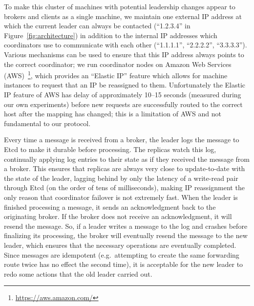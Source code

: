 To make this cluster of machines with potential leadership changes appear to brokers and clients as a single machine, we maintain one external IP address at which the current leader can always be contacted (``1.2.3.4'' in Figure~\ref{fig:architecture}) in addition to the internal IP addresses which coordinators use to communicate with each other (``1.1.1.1'', ``2.2.2.2'', ``3.3.3.3'').
Various mechanisms can be used to ensure that this IP address always points to the correct coordinator; we run coordinator nodes on Amazon Web Services (AWS)~\footnote{\url{https://aws.amazon.com/}}, which provides an ``Elastic IP'' feature which allows for machine instances to request that an IP be reassigned to them.
Unfortunately the Elastic IP feature of AWS has delay of approximately 10--15 seconds (measured during our own experiments) before new requests are successfully routed to the correct host after the mapping has changed; this is a limitation of AWS and not fundamental to our protocol.

Every time a message is received from a broker, the leader logs the message to Etcd to make it durable before processing.
The replicas watch this log, continually applying log entries to their state as if they received the message from a broker.
This ensures that replicas are always very close to update-to-date with the state of the leader, lagging behind by only the latency of a write-read pair through Etcd (on the order of tens of milliseconds), making IP reassignment the only reason that coordinator failover is not extremely fast.
When the leader is finished processing a message, it sends an acknowledgment back to the originating broker.
If the broker does not receive an acknowledgment, it will resend the message.
So, if a leader writes a message to the log and crashes before finalizing its processing, the broker will eventually resend the message to the new leader, which ensures that the necessary operations are eventually completed.
Since messages are idempotent (e.g.\ attempting to create the same forwarding route twice has no effect the second time), it is acceptable for the new leader to redo some actions that the old leader carried out.

